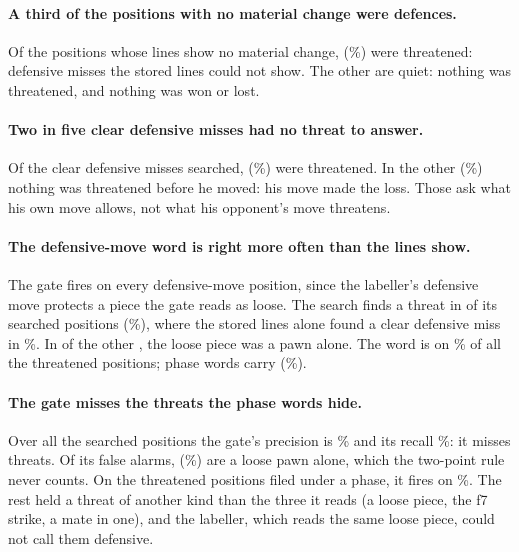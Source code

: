 \documentclass[11pt]{article}
\begin{document}
\begin{table}[h]
\centering
\small
\ThreatTable
\caption{The threat search by what the stored lines show and by theme word: positions, those in
check (not searched), the threatened share of the searched, how many by mate, and the live coach's
instant threat reader (the gate) against the search: how often it fires, how often a firing is a
real threat (precision), and how many of the threats it fires on (recall).}
\end{table}

\paragraph{A third of the positions with no material change were defences.} Of the
\NeitherSearched{} positions whose lines show no material change, \NeitherThreat{}
(\NeitherThreatShare\%) were threatened: defensive misses the stored lines could not show. The other
\Quiet{} are quiet: nothing was threatened, and nothing was won or lost.

\paragraph{Two in five clear defensive misses had no threat to answer.} Of the \DefSearched{}
clear defensive misses searched, \DefThreat{} (\DefThreatShare\%) were threatened. In the other
\SelfInflicted{} (\SelfShare\%) nothing was threatened before he moved: his move made the loss. Those
ask what his own move allows, not what his opponent's move threatens.

\paragraph{The defensive-move word is right more often than the lines show.} The gate fires on
every defensive-move position, since the labeller's defensive move protects a piece the gate reads as
loose. The search finds a threat in \DefWordThreat{} of its \DefWordSearched{} searched positions
(\DefWordThreatShare\%), where the stored lines alone found a clear defensive miss in \DefFit\%. In
\DefWordPawnOnly{} of the other \DefWordFalse{}, the loose piece was a pawn alone. The word is on
\DefWordOfThreats\% of all the threatened positions; phase words carry \PhaseThreat{}
(\PhaseThreatOfThreats\%).

\paragraph{The gate misses the threats the phase words hide.} Over all the searched positions the
gate's precision is \GatePrecision\% and its recall \GateRecall\%: it misses \GateMissed{} threats.
Of its \GateFalse{} false alarms, \GatePawnOnly{} (\GatePawnOnlyShare\%) are a loose pawn alone,
which the two-point rule never counts. On the \PhaseThreat{} threatened positions filed under a
phase, it fires on \PhaseGateRecall\%. The rest held a threat of another kind than the three it reads
(a loose piece, the f7 strike, a mate in one), and the labeller, which reads the same loose piece,
could not call them defensive.
\end{document}
